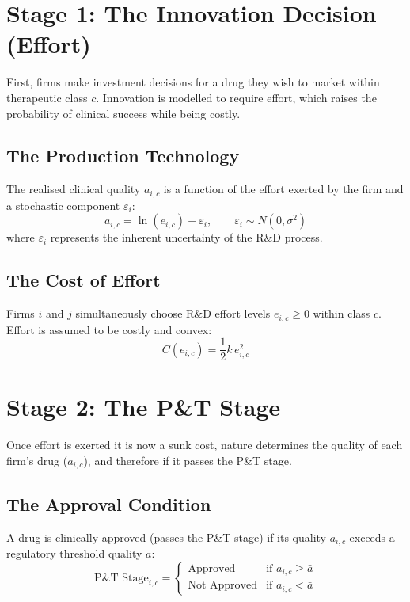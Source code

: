 \documentclass[12pt]{article}
\begin{document}
\newpage

\section{Stage 1: The Innovation Decision (Effort)}

First, firms make investment decisions for a drug they wish to market within therapeutic class $c$. Innovation is modelled to require effort, which raises the probability of clinical success while being costly.

\subsection{The Production Technology}
The realised clinical quality $a_{i,c}$ is a function of the effort exerted by the firm and a stochastic component $\varepsilon_i$:
\begin{equation}
    a_{i,c} = \ln(e_{i,c}) + \varepsilon_i, \qquad \varepsilon_i \sim N(0, \sigma^2)
\end{equation}
where $\varepsilon_i$ represents the inherent uncertainty of the R\&D process.

\subsection{The Cost of Effort}
Firms $i$ and $j$ simultaneously choose R\&D effort levels $e_{i,c} \geq 0$ within class $c$. Effort is assumed to be costly and convex:
\begin{equation}
    C(e_{i,c}) = \frac{1}{2} k \, e_{i,c}^2
\end{equation}

\newpage

\section{Stage 2: The P\&T Stage}
Once effort is exerted it is now a sunk cost, nature determines the quality of each firm's drug ($a_{i,c}$), and therefore if it passes the P\&T stage.

\subsection{The Approval Condition}
A drug is clinically approved (passes the P\&T stage) if its quality $a_{i,c}$ exceeds a regulatory threshold quality $\bar{a}$:
\begin{equation}
    \text{P\&T Stage}_{i,c} = 
    \begin{cases} 
        \text{Approved} & \text{if } a_{i,c} \geq \bar{a} \\
        \text{Not Approved} & \text{if } a_{i,c} < \bar{a}
    \end{cases}
\end{equation}
\end{document}
